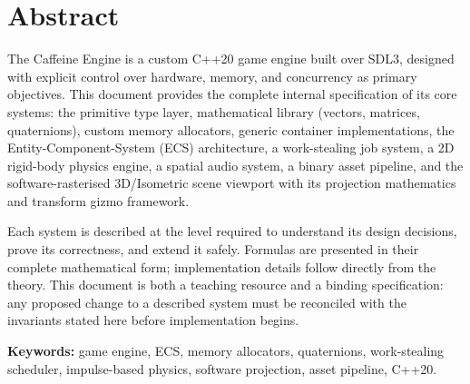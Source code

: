 \chapter*{Abstract}

The Caffeine Engine is a custom C++20 game engine built over SDL3, designed
with explicit control over hardware, memory, and concurrency as primary
objectives. This document provides the complete internal specification of its
core systems: the primitive type layer, mathematical library
(vectors, matrices, quaternions), custom memory allocators, generic
container implementations, the Entity-Component-System (ECS) architecture,
a work-stealing job system, a 2D rigid-body physics engine, a spatial audio
system, a binary asset pipeline, and the software-rasterised 3D/Isometric
scene viewport with its projection mathematics and transform gizmo framework.

Each system is described at the level required to understand its design
decisions, prove its correctness, and extend it safely. Formulas are
presented in their complete mathematical form; implementation details follow
directly from the theory. This document is both a teaching resource and a
binding specification: any proposed change to a described system must be
reconciled with the invariants stated here before implementation begins.

\bigskip
\textbf{Keywords:} game engine, ECS, memory allocators, quaternions,
work-stealing scheduler, impulse-based physics, software projection,
asset pipeline, C++20.

\pagestyle{plain}
\tableofcontents
\listoffigures
\listoftables
